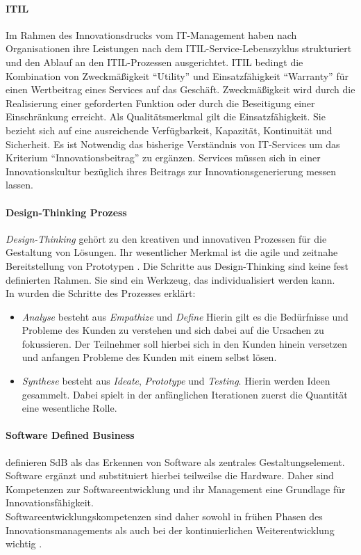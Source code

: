 \paragraph{ITIL}
\label{def:itil}
Im Rahmen des Innovationsdrucks vom IT-Management haben nach \citet{Alt2017} Organisationen ihre Leistungen nach dem ITIL-Service-Lebenszyklus strukturiert und den Ablauf an den ITIL-Prozessen ausgerichtet. ITIL bedingt die Kombination von Zweckmäßigkeit \enquote{Utility} und Einsatzfähigkeit \enquote{Warranty} für einen Wertbeitrag eines Services auf das Geschäft. Zweckmäßigkeit wird durch die Realisierung einer geforderten Funktion oder durch die Beseitigung einer Einschränkung erreicht. Als Qualitätsmerkmal gilt die Einsatzfähigkeit. Sie bezieht sich auf eine ausreichende Verfügbarkeit, Kapazität, Kontinuität und Sicherheit. Es ist Notwendig das bisherige Verständnis von IT-Services um das Kriterium \enquote{Innovationsbeitrag} zu ergänzen. Services müssen sich in einer Innovationskultur bezüglich ihres Beitrags zur Innovationsgenerierung messen lassen.

\paragraph{Design-Thinking Prozess}
\label{def-design-thinking}
\emph{Design-Thinking} gehört zu den kreativen und innovativen Prozessen für die Gestaltung von Lösungen. Ihr wesentlicher Merkmal ist die agile und zeitnahe Bereitstellung von Prototypen \cite{Alt2017}. Die Schritte aus Design-Thinking sind keine fest definierten Rahmen. Sie sind ein Werkzeug, das individualisiert werden kann.
\medskip
\\
In \cite{yüksel:digit} wurden die Schritte des Prozesses erklärt: 
\begin{itemize}
    \item  \emph{Analyse} besteht aus \emph{Empathize} und \emph{Define} Hierin gilt es die Bedürfnisse und Probleme des Kunden zu verstehen und sich dabei auf die Ursachen zu fokussieren. Der Teilnehmer soll hierbei sich in den Kunden hinein versetzen und anfangen Probleme des Kunden mit einem selbst lösen. 
    \item \emph{Synthese} besteht aus \emph{Ideate}, \emph{Prototype} und \emph{Testing}. Hierin werden Ideen gesammelt. Dabei spielt in der anfänglichen Iterationen zuerst die Quantität eine wesentliche Rolle.
\end{itemize}

\paragraph{Software Defined Business}
\citet[S. 51]{Alt2017} definieren \ac{SdB} als das Erkennen von Software als zentrales Gestaltungselement. Software ergänzt und substituiert hierbei teilweilse die Hardware. Daher sind Kompetenzen zur Softwareentwicklung und ihr Management eine Grundlage für Innovationsfähigkeit.
\medskip
\\
Softwareentwicklungskompetenzen sind daher sowohl in frühen Phasen des Innovationsmanagements als auch bei der kontinuierlichen Weiterentwicklung wichtig \cite{Alt2017}.
%
%
%

